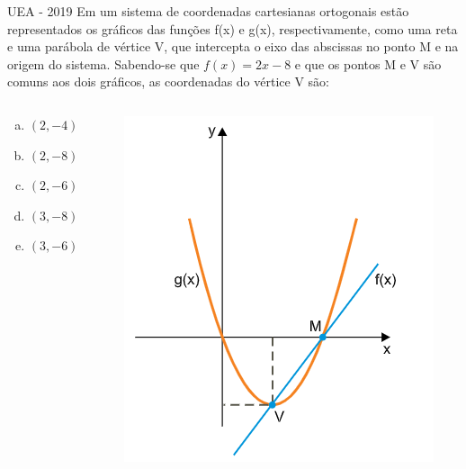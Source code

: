 \documentclass[11pt]{beamer}
\begin{document}
\begin{frame}{UEA - 2019}
    Em um sistema de coordenadas cartesianas ortogonais estão representados os gráficos das funções f(x) e g(x), respectivamente, como uma reta e uma parábola de vértice V, que intercepta o eixo das abscissas no ponto M e na origem do sistema. Sabendo-se que $f(x) = 2x - 8$ e que os pontos M e V são comuns aos dois gráficos, as coordenadas do vértice V são:

    \begin{columns}
        \begin{column}{0.4\textwidth}
            \begin{enumerate}[a)]
                \item $(2,-4)$ %
                \item $(2,-8)$
                \item $(2,-6)$
                \item $(3,-8)$
                \item $(3,-6)$
            \end{enumerate}
        \end{column}

        \begin{column}{0.45\textwidth}
            \centering
            \includegraphics[width=0.8\linewidth]{imagens/uea-macro-2019.png}
        \end{column}
    \end{columns}
\end{frame}
\end{document}
